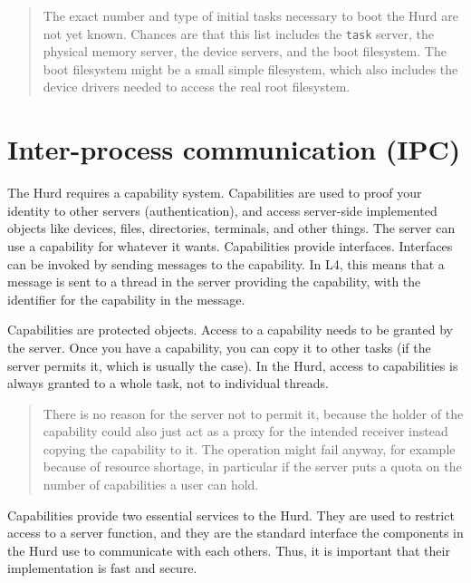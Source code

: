 \documentclass[9pt,a4paper]{extarticle}
\newenvironment{comment}{\footnotesize \begin{quote}}{\end{quote}}
\begin{document}
\begin{comment}
  The exact number and type of initial tasks necessary to boot the
  Hurd are not yet known.  Chances are that this list includes the
  \texttt{task} server, the physical memory server, the device
  servers, and the boot filesystem.  The boot filesystem might be a
  small simple filesystem, which also includes the device drivers
  needed to access the real root filesystem.
\end{comment}


\section{Inter-process communication (IPC)}
\label{ipc}

The Hurd requires a capability system.  Capabilities are used to proof
your identity to other servers (authentication), and access
server-side implemented objects like devices, files, directories,
terminals, and other things.  The server can use a capability for
whatever it wants.  Capabilities provide interfaces.  Interfaces can
be invoked by sending messages to the capability.  In L4, this means
that a message is sent to a thread in the server providing the
capability, with the identifier for the capability in the message.

Capabilities are protected objects.  Access to a capability needs to
be granted by the server.  Once you have a capability, you can copy it
to other tasks (if the server permits it, which is usually the case).
In the Hurd, access to capabilities is always granted to a whole task,
not to individual threads.

\begin{comment}
  There is no reason for the server not to permit it, because the
  holder of the capability could also just act as a proxy for the
  intended receiver instead copying the capability to it.  The
  operation might fail anyway, for example because of resource
  shortage, in particular if the server puts a quota on the number of
  capabilities a user can hold.
\end{comment}

Capabilities provide two essential services to the Hurd.  They are
used to restrict access to a server function, and they are the
standard interface the components in the Hurd use to communicate with
each others.  Thus, it is important that their implementation is fast
and secure.
\end{document}

